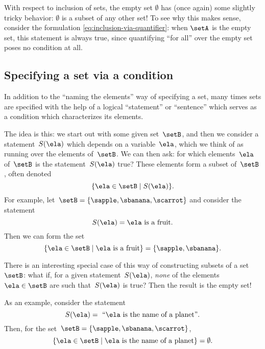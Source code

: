 With respect to inclusion of sets, the empty set $\emptyset$ has (once again) some slightly tricky behavior: $\emptyset$ is a subset of any other set!
To see why this makes sense, consider the formulation \cref{eq:inclusion-via-quantifier}: when $\setA$ is the empty set, this statement is always true, since quantifying ``for all'' over the empty set poses no condition at all.


\subsection{Specifying a set via a condition}

In addition to the ``naming the elements'' way of specifying a set, many times sets are specified with the help of a logical ``statement'' or ``sentence'' which serves as a condition which characterizes its elements.

The idea is this: we start out with some given set~$\setB$, and then we consider a statement~$S(\ela)$ which depends on a variable~$\ela$, which we think of as running over the elements of~$\setB$.
We can then ask: for which elements~$\ela$ of~$\setB$ is the statement~$S(\ela)$ true?
These elements form a subset of~$\setB$, often denoted
%
\begin{equation}
    \label{eq:axiom-specialization}
    \{ \ela \in \setB \mid S(\ela) \}.
\end{equation}
%
For example, let~$\setB = \{ \sapple, \sbanana, \scarrot \}$ and consider the statement
%
\begin{equation*}
    S(\ela) =  \ela \text{ is a fruit}.
\end{equation*}
%
Then we can form the set
%
\begin{equation*}
    \{ \ela \in \setB \mid \ela \text{ is a fruit} \} = \{ \sapple, \sbanana \}.
\end{equation*}

There is an interesting special case of this way of constructing subsets of a set~$\setB$:
what if, for a given statement~$S(\ela)$, \emph{none} of the elements~$\ela \in \setB$ are such that~$S(\ela)$ is true?
Then the result is the empty set!

As an example, consider the statement
%
\begin{equation*}
    S(\ela) =\text{ ``} \ela \text{ is the name of a planet''}.
\end{equation*}
%
Then, for the set~$\setB = \{ \sapple, \sbanana, \scarrot \}$,
\begin{equation*}
    \{ \ela \in \setB \mid \ela \text{ is the name of a planet} \} = \emptyset.
\end{equation*}



